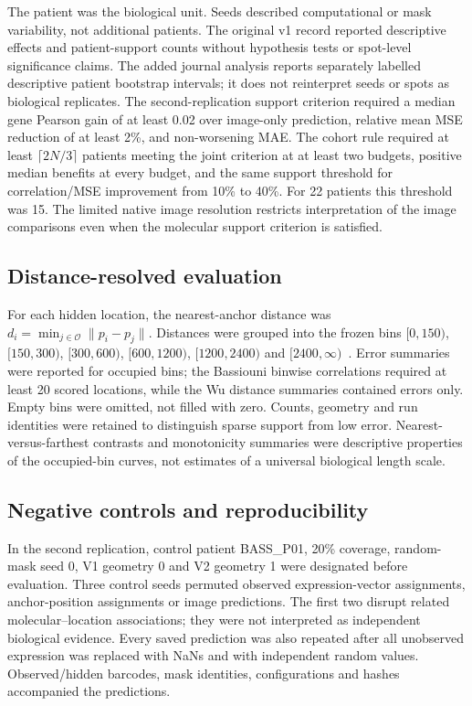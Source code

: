 The patient was the biological unit. Seeds described computational or mask variability, not additional patients. The original v1 record reported descriptive effects and patient-support counts without hypothesis tests or spot-level significance claims. The added journal analysis reports separately labelled descriptive patient bootstrap intervals; it does not reinterpret seeds or spots as biological replicates. The second-replication support criterion required a median gene Pearson gain of at least 0.02 over image-only prediction, relative mean MSE reduction of at least 2\%, and non-worsening MAE. The cohort rule required at least $\lceil2N/3\rceil$ patients meeting the joint criterion at at least two budgets, positive median benefits at every budget, and the same support threshold for correlation/MSE improvement from 10\% to 40\%. For 22 patients this threshold was 15. The limited native image resolution restricts interpretation of the image comparisons even when the molecular support criterion is satisfied.

\subsection{Distance-resolved evaluation}
For each hidden location, the nearest-anchor distance was $d_i=\min_{j\in\mathcal O}\|p_i-p_j\|$. Distances were grouped into the frozen bins $[0,150)$, $[150,300)$, $[300,600)$, $[600,1200)$, $[1200,2400)$ and $[2400,\infty)$~\um{}. Error summaries were reported for occupied bins; the Bassiouni binwise correlations required at least 20 scored locations, while the Wu distance summaries contained errors only. Empty bins were omitted, not filled with zero. Counts, geometry and run identities were retained to distinguish sparse support from low error. Nearest-versus-farthest contrasts and monotonicity summaries were descriptive properties of the occupied-bin curves, not estimates of a universal biological length scale.

\subsection{Negative controls and reproducibility}
In the second replication, control patient BASS\_P01, 20\% coverage, random-mask seed 0, V1 geometry 0 and V2 geometry 1 were designated before evaluation. Three control seeds permuted observed expression-vector assignments, anchor-position assignments or image predictions. The first two disrupt related molecular--location associations; they were not interpreted as independent biological evidence. Every saved prediction was also repeated after all unobserved expression was replaced with NaNs and with independent random values. Observed/hidden barcodes, mask identities, configurations and hashes accompanied the predictions.

